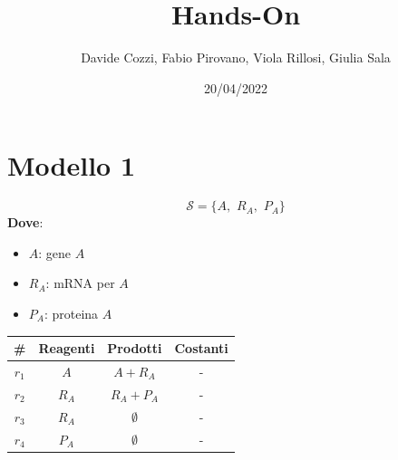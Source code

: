 \documentclass{article}
\title{Hands-On}
\author{Davide Cozzi, Fabio Pirovano, Viola Rillosi, Giulia Sala}
\date{20/04/2022}
\begin{document}
\maketitle

\section*{Modello 1}
\[\mathcal{S}=\{A,\,\, R_A, \,\,P_A\}\]
\textbf{Dove}:
\begin{itemize}
  \item $A$: gene $A$
  \item $R_A$: mRNA per $A$
  \item $P_A$: proteina $A$
\end{itemize}
\begin{table}[H]
  \centering
  \begin{tabular}{c|c|c|c}
    \# & \textbf{Reagenti} & \textbf{Prodotti} & \textbf{Costanti}\\
    \hline
    \hline
    $r_1$ & $A$ & $A+R_A$ & -\\
    $r_2$ & $R_A$ & $R_A+P_A$ & -\\
    $r_3$ & $R_A$ & $\emptyset$ & -\\
    $r_4$ & $P_A$ & $\emptyset$ & -\\
  \end{tabular}
\end{table}
\newpage
\end{document}
